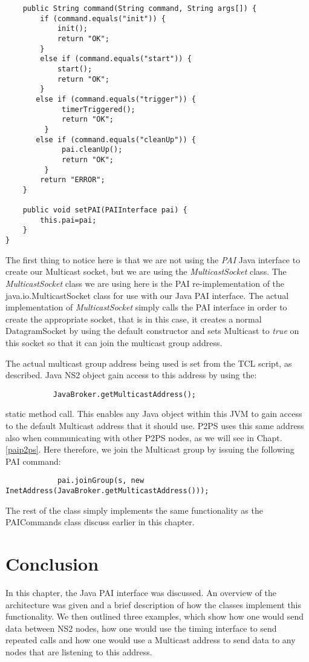 \begin{verbatim}
    public String command(String command, String args[]) {
        if (command.equals("init")) {
            init();
            return "OK";
        }
        else if (command.equals("start")) {
            start();
            return "OK";
        }
       else if (command.equals("trigger")) {
             timerTriggered();
             return "OK";
         }
       else if (command.equals("cleanUp")) {
             pai.cleanUp();
             return "OK";
         }
        return "ERROR";
    }

    public void setPAI(PAIInterface pai) {
        this.pai=pai;
    }
}
\end{verbatim}
\normalsize


The first thing to notice here is that we are not using the \emph{PAI}
Java interface to create our Multicast socket, but we are using the
\emph{MulticastSocket} class.  The \emph{MulticastSocket} class
we are using here is the PAI re-implementation of the java.io.MulticastSocket 
class for use with our Java PAI interface.  The actual implementation
of \emph{MulticastSocket} simply calls the PAI interface in order to 
create the appropriate socket, that is in this case, it creates a
normal DatagramSocket by using the default constructor and sets
Multicast to \emph{true} on this socket so that it can join the 
multicast group address.

The actual multicast group address being used is set from the
TCL script, as described.  Java NS2 object gain access to this
address by using the:

\footnotesize
\begin{verbatim}
           JavaBroker.getMulticastAddress();
\end{verbatim}
\normalsize

\noindent static method call.  This enables any Java object 
within this JVM to gain access to the default Multicast address 
that it should use.  P2PS uses this same address also when 
communicating with other P2PS nodes, as we will see in Chapt.
\ref{paip2ps}.   Here therefore, we join the Multicast group
by issuing the following PAI command:

\footnotesize
\begin{verbatim}
            pai.joinGroup(s, new InetAddress(JavaBroker.getMulticastAddress()));
\end{verbatim}
\normalsize

The rest of the class simply implements the same functionality
as the PAICommands class discuss earlier in this chapter.

\section{Conclusion}

In this chapter, the Java PAI interface was discussed. An overview
of the architecture was given and a brief description of how the
classes implement this functionality. We then outlined three
examples, which show how one would send data between NS2 
nodes, how one would use the timing interface to send repeated
calls and how one would use a Multicast address to send data to 
any nodes that are listening to this address.
